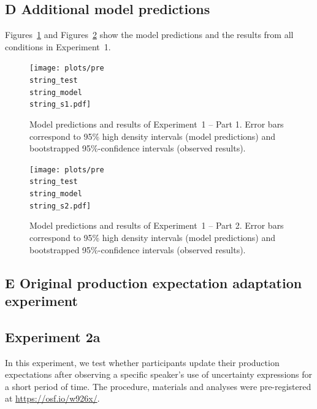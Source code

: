 \documentclass[man, floatsintext]{apa6}
\begin{document}
\pagebreak

\subsection*{D Additional model predictions}

Figures~\ref{fig:norming-results-model-1} and Figures~\ref{fig:norming-results-model-2} show the model predictions and the results from all conditions in Experiment~1. 

\begin{figure}[h!]
\texttt{[image: plots/pre\\string\_test\\string\_model\\string\_s1.pdf]}
\caption{Model predictions and results of Experiment~1 -- Part 1. Error bars correspond to 95\% high density intervals (model predictions) and bootstrapped 95\%-confidence intervals (observed results). \label{fig:norming-results-model-1}}

\end{figure}

\begin{figure}[h!]
\texttt{[image: plots/pre\\string\_test\\string\_model\\string\_s2.pdf]}
\caption{Model predictions and results of Experiment~1  -- Part 2. Error bars correspond to 95\% high density intervals (model predictions) and bootstrapped 95\%-confidence intervals (observed results). \label{fig:norming-results-model-2}}

\end{figure}

\pagebreak
\FloatBarrier

\subsection*{E Original production expectation adaptation experiment}

\subsection{Experiment 2a}
In this experiment, we test whether participants update their production expectations after observing a specific speaker's use of 
uncertainty expressions for a short period of time. The procedure, materials and analyses were pre-registered at \url{https://osf.io/w926x/}.
\end{document}
